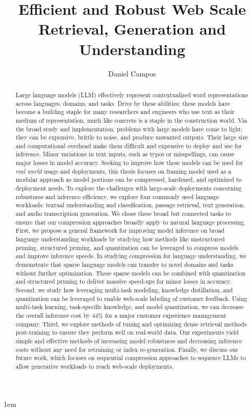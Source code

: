 \documentclass[draftthesis,tocnosub,noragright,centerchapter,fullpagesingle,12pt]{uiuc_csthesis21}
\title{Efficient and Robust Web Scale Retrieval, Generation and Understanding}
\author{Daniel Campos}
\numberwithin{algocf}{chapter}
\theoremstyle{definition}
\begin{document}
\maketitle
\parindent 1em%

\frontmatter
\begin{abstract}
Large language models (LLM) effectively represent contextualized word representations across languages, domains, and tasks. Drive by these abilities; these models have become a building staple for many researchers and engineers who use text as their medium of representation, much like concrete is a staple in the construction world. Via the broad study and implementation, problems with large models have come to light: they can be expensive, brittle to noise, and produce unwanted outputs. Their large size and computational overhead make them difficult and expensive to deploy and use for inference. Minor variations in text inputs, such as typos or misspellings, can cause major losses in model accuracy. Seeking to improve how these models can be used for \textit{real world} usage and deployments, this thesis focuses on framing model used as a modular approach as model portions can be compressed, hardened, and optimized to deployment needs. To explore the challenges with large-scale deployments concerning robustness and inference efficiency, we explore four commonly used language workloads: textual understanding and classification, passage retrieval, text generation, and audio transcription generation. We chose these broad but connected tasks to ensure that our compression approaches broadly apply to natural language processing. First, we propose a general framework for improving model inference on broad language understanding workloads by studying how methods like unstructured pruning, structured pruning, and quantization can be leveraged to compress models and improve inference speeds. In studying compression for language understanding, we demonstrate that sparse language models can transfer to novel domains and tasks without further optimization. These sparse models can be combined with quantization and structured pruning to deliver massive speed-ups for minor losses in accuracy. Second, we study how leveraging multi-task modeling, knowledge distillation, and quantization can be leveraged to enable web-scale labeling of customer feedback. Using multi-task learning, task-specific knowledge, and model quantization, we can decrease the overall inference cost by 44\% for a major customer experience management company.  Third, we explore methods of tuning and optimizing dense retrieval methods post-training to ensure they perform well on real-world data. Our experiments yield simple and effective methods of increasing model robustness and decreasing inference costs without any need for retraining or index re-generation. Finally, we discuss our future work, which focuses on sequential compression approaches to sequence LLMs to allow generative workloads to reach web-scale deployments.
\end{abstract}
\tableofcontents
\mainmatter
\end{document}
